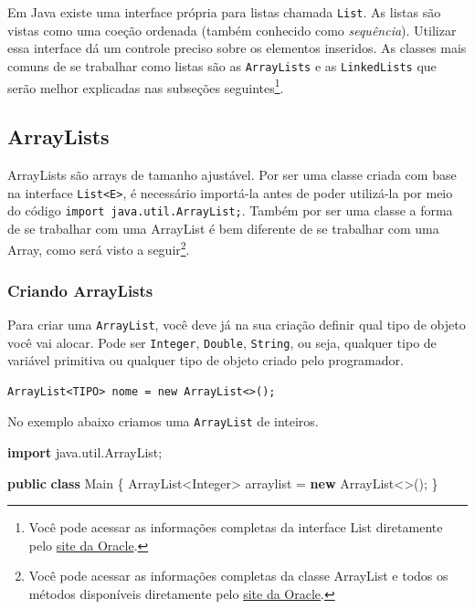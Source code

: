 \documentclass[
]{book}
\newenvironment{Shaded}{\begin{snugshade}}{\end{snugshade}}
\newcommand{\BuiltInTok}[1]{#1}
\newcommand{\ImportTok}[1]{#1}
\newcommand{\KeywordTok}[1]{\textcolor[rgb]{0.13,0.29,0.53}{\textbf{#1}}}
\newcommand{\NormalTok}[1]{#1}
\begin{document}
Em Java existe uma interface própria para listas chamada \texttt{List}. As listas são vistas como uma coeção ordenada (também conhecido como \emph{sequência}). Utilizar essa interface dá um controle preciso sobre os elementos inseridos. As classes mais comuns de se trabalhar como listas são as \texttt{ArrayLists} e as \texttt{LinkedLists} que serão melhor explicadas nas subseções seguintes\footnote{Você pode acessar as informações completas da interface List diretamente pelo \href{https://docs.oracle.com/javase/8/docs/api/java/util/List.html}{site da Oracle}.}.

\hypertarget{arraylists}{%
\subsection{ArrayLists}\label{arraylists}}

ArrayLists são arrays de tamanho ajustável. Por ser uma classe criada com base na interface \texttt{List\textless{}E\textgreater{}}, é necessário importá-la antes de poder utilizá-la por meio do código \texttt{import\ java.util.ArrayList;}. Também por ser uma classe a forma de se trabalhar com uma ArrayList é bem diferente de se trabalhar com uma Array, como será visto a seguir\footnote{Você pode acessar as informações completas da classe ArrayList e todos os métodos disponíveis diretamente pelo \href{https://docs.oracle.com/en/java/javase/11/docs/api/java.base/java/util/ArrayList.html}{site da Oracle}.}.

\hypertarget{criando-arraylists}{%
\subsubsection*{Criando ArrayLists}\label{criando-arraylists}}

Para criar uma \texttt{ArrayList}, você deve já na sua criação definir qual tipo de objeto você vai alocar. Pode ser \texttt{Integer}, \texttt{Double}, \texttt{String}, ou seja, qualquer tipo de variável primitiva ou qualquer tipo de objeto criado pelo programador.

\begin{verbatim}
ArrayList<TIPO> nome = new ArrayList<>();
\end{verbatim}

No exemplo abaixo criamos uma \texttt{ArrayList} de inteiros.

\begin{Shaded}
\begin{Highlighting}[]
\KeywordTok{import}\ImportTok{ java.util.ArrayList;}

\KeywordTok{public} \KeywordTok{class}\NormalTok{ Main \{}
    \BuiltInTok{ArrayList}\NormalTok{<}\BuiltInTok{Integer}\NormalTok{> arraylist = }\KeywordTok{new} \BuiltInTok{ArrayList}\NormalTok{<>();}
\NormalTok{\}}
\end{Highlighting}
\end{Shaded}
\end{document}
